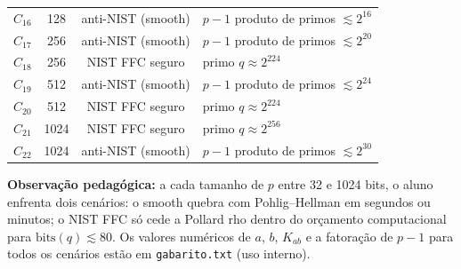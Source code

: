 \documentclass[12pt,a4paper]{article}
\begin{document}
\begin{tcolorbox}[colback=red!5, colframe=red!40, title=\textbf{Tipo de cada cenário e $\mathrm{ord}(\alpha)$}, fonttitle=\small]
\begin{center}
\begin{tabular}{cccl}
$C_{16}$ & 128  & anti-NIST (smooth) & $p-1$ produto de primos $\lesssim 2^{16}$ \\
$C_{17}$ & 256  & anti-NIST (smooth) & $p-1$ produto de primos $\lesssim 2^{20}$ \\
$C_{18}$ & 256  & NIST FFC seguro    & primo $q \approx 2^{224}$ \\
$C_{19}$ & 512  & anti-NIST (smooth) & $p-1$ produto de primos $\lesssim 2^{24}$ \\
$C_{20}$ & 512  & NIST FFC seguro    & primo $q \approx 2^{224}$ \\
$C_{21}$ & 1024 & NIST FFC seguro    & primo $q \approx 2^{256}$ \\
$C_{22}$ & 1024 & anti-NIST (smooth) & $p-1$ produto de primos $\lesssim 2^{30}$ \\
\bottomrule
\end{tabular}
\end{center}

\textbf{Observação pedagógica:} a cada tamanho de $p$ entre 32 e 1024 bits, o aluno enfrenta dois cenários: o smooth quebra com Pohlig--Hellman em segundos ou minutos; o NIST FFC só cede a Pollard rho dentro do orçamento computacional para $\mathrm{bits}(q) \lesssim 80$. Os valores numéricos de $a$, $b$, $K_{ab}$ e a fatoração de $p-1$ para todos os cenários estão em \texttt{gabarito.txt} (uso interno).
\end{tcolorbox}

\fi %
\end{document}
